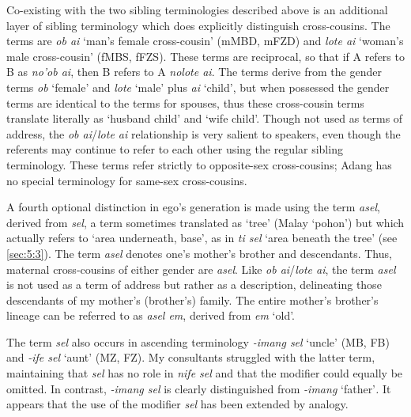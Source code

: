 Co-existing with the two sibling terminologies described above is an additional layer of sibling terminology which does explicitly distinguish cross-cousins. The terms are \textit{ob ai} `man's female cross-cousin' (mMBD, mFZD) and \textit{lote ai} `woman's male cross-cousin' (fMBS, fFZS). These terms are reciprocal, so that if A refers to B as \textit{no'ob ai}, then B refers to A \textit{nolote ai}. The terms derive from the gender terms \textit{ob} `female' and \textit{lote} `male' plus \textit{ai} `child', but when possessed the gender terms are identical to the terms for spouses, thus these cross-cousin terms translate literally as `husband child' and `wife child'. Though not used as terms of address, the \textit{ob ai}/\textit{lote ai} relationship is very salient to speakers, even though the referents may continue to refer to each other using the regular sibling terminology. These terms refer strictly to opposite-sex cross-cousins; Adang has no special terminology for same-sex cross-cousins. 

A fourth optional distinction in ego's generation is made using the term \textit{asel}, derived from \textit{sel}, a term sometimes translated as `tree' (Malay `pohon') but which actually refers to `area underneath, base', as in \textit{ti sel } `area beneath the tree' (see {\SS} \ref{sec:5:3}). The term \textit{asel} denotes one's mother's brother and descendants. Thus, maternal cross-cousins of either gender are \textit{asel}. Like \textit{ob ai}/\textit{lote ai}, the term \textit{asel} is not used as a term of address but rather as a description, delineating those descendants of my mother's (brother's) family. The entire mother's brother's lineage can be referred to as \textit{asel em}, derived from \textit{em} `old'. 

The term \textit{sel} also occurs in ascending terminology \textit{-imang sel} `uncle' (MB, FB) and \textit{-ife sel} `aunt' (MZ, FZ). My consultants struggled with the latter term, maintaining that \textit{sel} has no role in \textit{nife sel} and that the modifier could equally be omitted. In contrast, \textit{-imang sel} is clearly distinguished from \textit{-imang} `father'\textit{.} It appears that the use of the modifier \textit{sel} has been extended by analogy.


 


